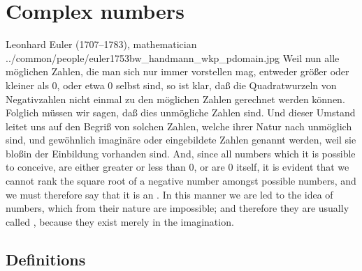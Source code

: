 \section{Complex numbers}
\qboxnpqt
  {
    Leonhard Euler (1707--1783), mathematician
    \footnotemark
  }
  {../common/people/euler1753bw_handmann_wkp_pdomain.jpg}
  {Weil nun alle m\"oglichen Zahlen, die man sich nur immer vorstellen mag,
    entweder gr\"o{\ss}er oder kleiner als 0, oder etwa 0 selbst sind, so ist klar, da{\ss}
    die Quadratwurzeln von Negativzahlen nicht einmal zu den m\"oglichen Zahlen
    gerechnet werden k\"onnen.
    Folglich m\"ussen wir sagen, da{\ss} dies unm\"ogliche Zahlen sind.
    Und dieser Umstand leitet uns auf den Begri{\ss} von solchen Zahlen,
    welche ihrer Natur nach unm\"oglich sind, und gew\"ohnlich imagin\"are
    oder eingebildete Zahlen genannt werden, weil sie blo\ss in der Einbildung
    vorhanden sind.}
  {And, since all numbers which it is possible to conceive,
    are either greater or less than 0, or are 0 itself,
    it is evident that we cannot rank the square root of a negative
    number amongst possible numbers, and we must therefore say that
    it is an .
    In this manner we are led to the idea of numbers,
    which from their nature are impossible;
    and therefore they are usually called ,
    because they exist merely in the imagination.}

\subsection{Definitions}
\begin{definition}
\label{def:C}
\end{definition}




